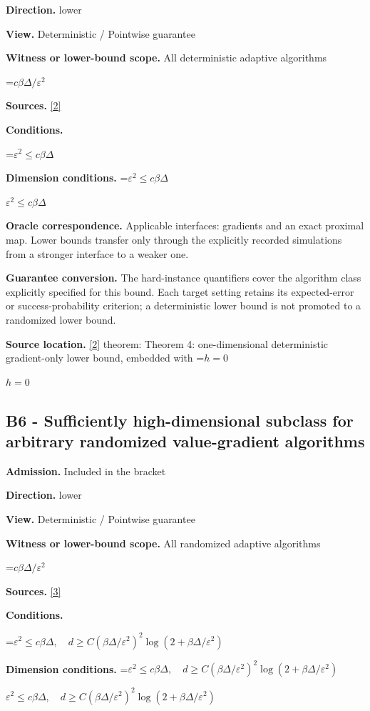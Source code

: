\documentclass[10pt,a4paper]{article}
\newcommand{\AtlasMath}[1]{\par\begingroup\centering\setbox0=\hbox{$\displaystyle #1$}\ifdim\wd0>1.4\linewidth\typeout{ATLAS WIDE FORMULA: \the\wd0}\fi\ifdim\wd0>\linewidth\resizebox{\linewidth}{!}{\box0}\else\box0\fi\par\endgroup}
\newcommand{\AtlasInlineMath}[1]{\begingroup\setbox0=\hbox{$#1$}\ifdim\wd0>.4\linewidth\endgroup\AtlasMath{#1}\else\endgroup$#1$\fi}
\begin{document}
\textbf{Direction.} lower

\textbf{View.} Deterministic / Pointwise guarantee

\textbf{Witness or lower-bound scope.} All deterministic adaptive algorithms

\AtlasMath{c\beta\Delta/\varepsilon^2}
\textbf{Sources.} \href{https://arxiv.org/pdf/2209.07513}{[2]}

\textbf{Conditions.} 
\AtlasMath{\varepsilon^2\le c\beta\Delta}


\textbf{Dimension conditions.} \AtlasInlineMath{\varepsilon^2\le c\beta\Delta}

\textbf{Oracle correspondence.} Applicable interfaces: gradients and an exact proximal map. Lower bounds transfer only through the explicitly recorded simulations from a stronger interface to a weaker one.

\textbf{Guarantee conversion.} The hard-instance quantifiers cover the algorithm class explicitly specified for this bound. Each target setting retains its expected-error or success-probability criterion; a deterministic lower bound is not promoted to a randomized lower bound.

\textbf{Source location.} \href{https://arxiv.org/pdf/2209.07513}{[2]} theorem: Theorem 4: one-dimensional deterministic gradient-only lower bound, embedded with \AtlasInlineMath{h=0}

\subsection{B6 - Sufficiently high-dimensional subclass for arbitrary randomized value-gradient algorithms}
\textbf{Admission.} Included in the bracket

\textbf{Direction.} lower

\textbf{View.} Deterministic / Pointwise guarantee

\textbf{Witness or lower-bound scope.} All randomized adaptive algorithms

\AtlasMath{c\beta\Delta/\varepsilon^2}
\textbf{Sources.} \href{https://arxiv.org/pdf/1710.11606}{[3]}

\textbf{Conditions.} 
\AtlasMath{\varepsilon^2\le c\beta\Delta,\quad d\ge C(\beta\Delta/\varepsilon^2)^2\log(2+\beta\Delta/\varepsilon^2)}


\textbf{Dimension conditions.} \AtlasInlineMath{\varepsilon^2\le c\beta\Delta,\quad d\ge C(\beta\Delta/\varepsilon^2)^2\log(2+\beta\Delta/\varepsilon^2)}
\end{document}
